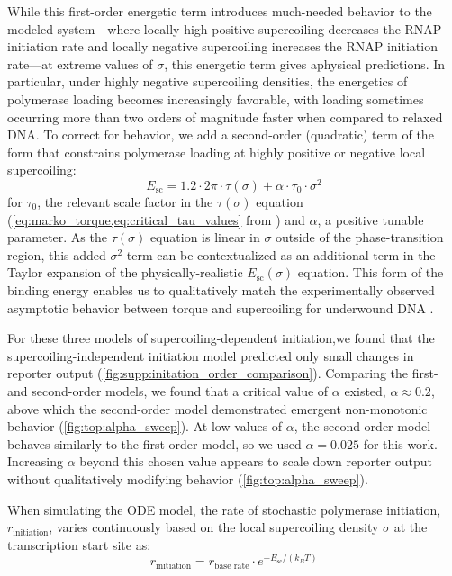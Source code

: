 \documentclass[11pt]{article}
\begin{document}
While this first-order energetic term introduces much-needed behavior to the modeled system---where locally high positive supercoiling decreases the RNAP initiation rate and locally negative supercoiling increases the RNAP initiation rate---at extreme values of \(\sigma\), this energetic term gives aphysical predictions. In particular, under highly negative supercoiling densities, the energetics of polymerase loading becomes increasingly favorable, with loading sometimes occurring more than two orders of magnitude faster when compared to relaxed DNA. To correct for behavior, we add a second-order (quadratic) term of the form that constrains polymerase loading at highly positive or negative local supercoiling:
\begin{equation}
    E_\text{sc} = 1.2  \cdot 2\pi \cdot \tau(\sigma) + \alpha \cdot \tau_0 \cdot \sigma^2
\label{eq:second_order_sc_initation}
\end{equation}
for \(\tau_0\), the relevant scale factor in the \(\tau(\sigma)\) equation (\cref{eq:marko_torque,eq:critical_tau_values} from \parencite{markoTorqueDynamicsLinking2007}) and \(\alpha\), a positive tunable parameter. As the \(\tau(\sigma)\) equation is linear in \(\sigma\) outside of the phase-transition region, this added \(\sigma^2\) term can be contextualized as an additional term in the Taylor expansion of the physically-realistic \(E_\text{sc}(\sigma)\) equation. This form of the binding energy enables us to qualitatively match the experimentally observed asymptotic behavior between torque and supercoiling for underwound DNA \parencite{leSynergisticCoordinationChromatin2019}.

For these three models of supercoiling-dependent initiation,we found that the supercoiling-independent initiation model predicted only small changes in reporter output (\cref{fig:supp:initation_order_comparison}). Comparing the first- and second-order models, we found that a critical value of \(\alpha\) existed, \(\alpha \approx 0.2\), above which the second-order model demonstrated emergent non-monotonic behavior (\cref{fig:top:alpha_sweep}). At low values of \(\alpha\), the second-order model behaves similarly to the first-order model, so we used \(\alpha = 0.025\) for this work. Increasing \(\alpha\) beyond this chosen value appears to scale down reporter output without qualitatively modifying behavior (\cref{fig:top:alpha_sweep}).

When simulating the ODE model, the rate of stochastic polymerase initiation, \(r_\text{initiation}\), varies continuously based on the local supercoiling density \(\sigma\) at the transcription start site as:
\begin{equation}
    r_\text{initiation} = r_\text{base rate} \cdot e^{- E_\text{sc} / (k_B T)}
\label{eq:intermediate_init_rate}
\end{equation}
\end{document}
